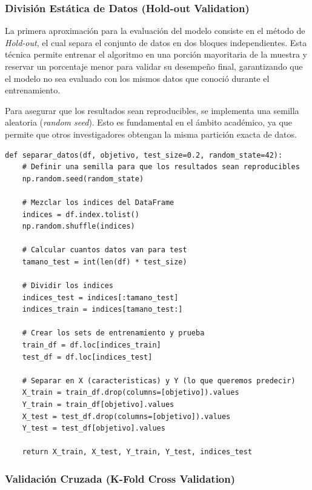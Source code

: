 \documentclass[12pt]{article}
\begin{document}
\subsubsection{División Estática de Datos (Hold-out Validation)}

La primera aproximación para la evaluación del modelo consiste en el método de \textit{Hold-out}, el cual separa el conjunto de datos en dos bloques independientes. Esta técnica permite entrenar el algoritmo en una porción mayoritaria de la muestra y reservar un porcentaje menor para validar su desempeño final, garantizando que el modelo no sea evaluado con los mismos datos que conoció durante el entrenamiento.

Para asegurar que los resultados sean reproducibles, se implementa una semilla aleatoria (\textit{random seed}). Esto es fundamental en el ámbito académico, ya que permite que otros investigadores obtengan la misma partición exacta de datos.

\begin{minipage}{0.9\textwidth}
\begin{lstlisting}[caption={Función para la separación estática de datos}]
def separar_datos(df, objetivo, test_size=0.2, random_state=42):
    # Definir una semilla para que los resultados sean reproducibles
    np.random.seed(random_state)
    
    # Mezclar los indices del DataFrame
    indices = df.index.tolist()
    np.random.shuffle(indices)
    
    # Calcular cuantos datos van para test
    tamano_test = int(len(df) * test_size)
    
    # Dividir los indices
    indices_test = indices[:tamano_test]
    indices_train = indices[tamano_test:]
    
    # Crear los sets de entrenamiento y prueba
    train_df = df.loc[indices_train]
    test_df = df.loc[indices_test]
    
    # Separar en X (caracteristicas) y Y (lo que queremos predecir)
    X_train = train_df.drop(columns=[objetivo]).values
    Y_train = train_df[objetivo].values
    X_test = test_df.drop(columns=[objetivo]).values
    Y_test = test_df[objetivo].values
    
    return X_train, X_test, Y_train, Y_test, indices_test
\end{lstlisting}
\end{minipage}

\subsubsection{Validación Cruzada (K-Fold Cross Validation)}
\end{document}
